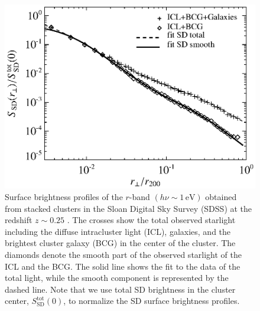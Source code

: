 \documentclass[10pt,aps,pra,reprint,amsmath,amsfonts,amssymb,showpacs,nofootinbib,floatfix]{revtex4-1}
\newcommand{\rmn}{\mathrm}
\newcommand{\sd}{\rmn{SD}}
\newcommand{\ev}{\rmn{eV}}
\begin{document}
{\begin{figure}%
 \includegraphics[width=0.99\columnwidth]{figures/SB.photon.eps}
 \caption{Surface brightness profiles of the $r$-band $(h\nu\sim
   1\,\ev)$ obtained from stacked clusters in the Sloan Digital Sky
   Survey (SDSS) at the redshift $z \sim 0.25$ \protect
   \cite{2005MNRAS.358..949Z}. The crosses show the total observed
   starlight including the diffuse intracluster light (ICL), galaxies,
   and the brightest cluster galaxy (BCG) in the center of the
   cluster. The diamonds denote the smooth part of the observed
   starlight of the ICL and the BCG. The solid line shows the fit to
   the data of the total light, while the smooth component is
   represented by the dashed line. Note that we use total SD
   brightness in the cluster center, $S_\sd^\rmn{tot}(0)$, to
   normalize the SD surface brightness profiles.}
 \label{fig:SD_spatial}
\end{figure}

}
\end{document}
